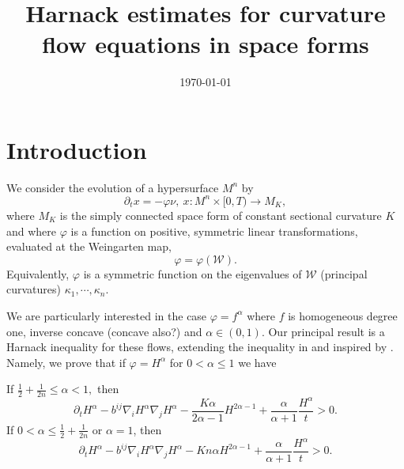 \documentclass{amsart}
\begin{document}
\title[]
 {Harnack estimates for curvature flow equations in space forms}

\curraddr{}
\email{}
\date{\today}

\dedicatory{}
\subjclass[2010]{}
\keywords{}

\begin{abstract}
\end{abstract}

\maketitle

\section{Introduction}

We consider the evolution of a hypersurface $M^n$ by
\[
\partial_tx=-\varphi\nu,~ x:M^n\times[0,T)\to M_K,
\]
where \(M_K\) is the simply connected space form of constant sectional curvature \(K\) and where $\varphi$ is a function on positive, symmetric linear transformations, evaluated at the Weingarten map,
\[
\varphi = \varphi(\mathcal{W}).
\]
Equivalently, \(\varphi\) is a symmetric function on the eigenvalues of \(\mathcal{W}\) (principal curvatures) \(\kappa_1, \cdots, \kappa_n\).

We are particularly interested in the case \(\varphi = f^{\alpha}\) where \(f\) is homogeneous degree one, inverse concave (concave also?) and \(\alpha \in (0,1)\). Our principal result is a Harnack inequality for these flows, extending the inequality in \cite{2015arXiv150802821B, bryanlouie} and inspired by \cite{MR1316556, MR1100812, MR1296393, MR1480081}. Namely, we prove that if \(\varphi = H^{\alpha}\) for \(0 < \alpha \leq 1\) we have

\begin{theorem}
If $\frac{1}{2}+\frac{1}{2n}\leq {\alpha}< 1,$ then
\[
\partial_t H^{\alpha} - b^{ij}\nabla_iH^{\alpha}\nabla_jH^{\alpha} - \frac{K {\alpha}}{2{\alpha}-1}H^{2{\alpha}-1} + \frac{{\alpha}}{{\alpha}+1} \frac{H^{\alpha}}{t} > 0.
\]
If $0<{\alpha}\leq \frac{1}{2} + \frac{1}{2n}$ or ${\alpha}=1$, then
\[
\partial_t H^{\alpha} - b^{ij}\nabla_iH^{\alpha}\nabla_jH^{\alpha} - K n{\alpha}H^{2{\alpha}-1} + \frac{{\alpha}}{{\alpha}+1} \frac{H^{\alpha}}{t} > 0.
\]
\end{theorem}
\end{document}
